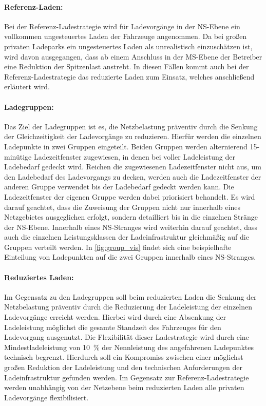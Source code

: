 \paragraph{Referenz-Laden:}

Bei der Referenz-Ladestrategie wird für Ladevorgänge in der \gls{NS}-Ebene ein vollkommen ungesteuertes Laden der Fahrzeuge angenommen.
Da bei großen privaten Ladeparks ein ungesteuertes Laden als unrealistisch einzuschätzen ist, wird davon ausgegangen, dass ab einem Anschluss in der \gls{MS}-Ebene der Betreiber eine Reduktion der Spitzenlast anstrebt.
In diesen Fällen kommt auch bei der Referenz-Ladestrategie das reduzierte Laden zum Einsatz, welches anschließend erläutert wird.


\paragraph{Ladegruppen:}

Das Ziel der Ladegruppen ist es, die Netzbelastung präventiv durch die Senkung der Gleichzeitigkeit der Ladevorgänge zu reduzieren.
Hierfür werden die einzelnen Ladepunkte in zwei Gruppen eingeteilt.
Beiden Gruppen werden alternierend 15-minütige Ladezeitfenster zugewiesen, in denen bei voller Ladeleistung der Ladebedarf gedeckt wird.
Reichen die zugewiesenen Ladezeitfenster nicht aus, um den Ladebedarf des Ladevorgangs zu decken, werden auch die Ladezeitfenster der anderen Gruppe verwendet bis der Ladebedarf gedeckt werden kann.
Die Ladezeitfenster der eigenen Gruppe werden dabei priorisiert behandelt.
Es wird darauf geachtet, dass die Zuweisung der Gruppen nicht nur innerhalb eines Netzgebietes ausgeglichen erfolgt, sondern detailliert bis in die einzelnen Stränge der \gls{NS}-Ebene.
Innerhalb eines \gls{NS}-Stranges wird weiterhin darauf geachtet, dass auch die einzelnen Leistungsklassen der Ladeinfrastruktur gleichmäßig auf die Gruppen verteilt werden.
In \autoref{fig:group_vis} findet sich eine beispielhafte Einteilung von Ladepunkten auf die zwei Gruppen innerhalb eines \gls{NS}-Stranges.




\paragraph{Reduziertes Laden:}

Im Gegensatz zu den Ladegruppen soll beim reduzierten Laden die Senkung der Netzbelastung präventiv durch die Reduzierung der Ladeleistung der einzelnen Ladevorgänge erreicht werden.
Hierbei wird durch eine Absenkung der Ladeleistung möglichst die gesamte Standzeit des Fahrzeuges für den Ladevorgang ausgenutzt.
Die Flexibilität dieser Ladestrategie wird durch eine Mindestladeleistung von \SI{10}{\percent} der Nennleistung des angefahrenen Ladepunktes technisch begrenzt.
Hierdurch soll ein Kompromiss zwischen einer möglichst großen Reduktion der Ladeleistung und den technischen Anforderungen der Ladeinfrastruktur gefunden werden.
Im Gegensatz zur Referenz-Ladestrategie werden unabhängig von der Netzebene beim reduzierten Laden alle privaten Ladevorgänge flexibilisiert.

